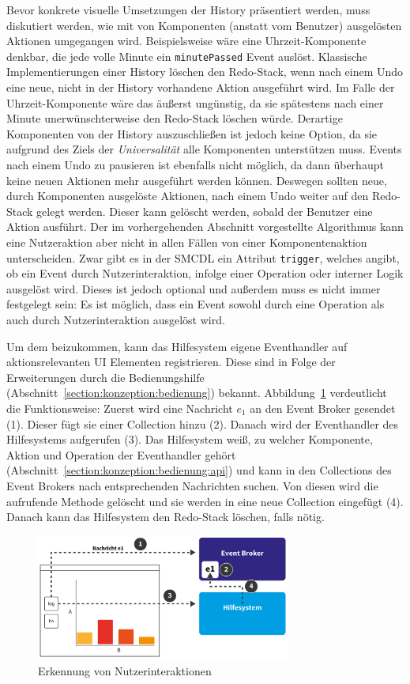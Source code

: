 \documentclass[
	headsepline,
	footsepline,
	fontsize=12pt,
	bibliography=totoc
]{scrbook}
\begin{document}
Bevor konkrete visuelle Umsetzungen der History präsentiert werden, muss diskutiert werden, wie mit von Komponenten (anstatt vom Benutzer) ausgelösten Aktionen umgegangen wird. Beispielsweise wäre eine Uhrzeit-Komponente denkbar, die jede volle Minute ein \texttt{minutePassed} Event auslöst. Klassische Implementierungen einer History löschen den Redo-Stack, wenn nach einem Undo eine neue, nicht in der History vorhandene Aktion ausgeführt wird. Im Falle der Uhrzeit-Komponente wäre das äußerst ungünstig, da sie spätestens nach einer Minute unerwünschterweise den Redo-Stack löschen würde. Derartige Komponenten von der History auszuschließen ist jedoch keine Option, da sie aufgrund des Ziels der \textit{Universalität} alle Komponenten unterstützen muss. Events nach einem Undo zu pausieren ist ebenfalls nicht möglich, da dann überhaupt keine neuen Aktionen mehr ausgeführt werden können. Deswegen sollten neue, durch Komponenten ausgelöste Aktionen, nach einem Undo weiter auf den Redo-Stack gelegt werden. Dieser kann gelöscht werden, sobald der Benutzer eine Aktion ausführt. Der im vorhergehenden Abschnitt vorgestellte Algorithmus kann eine Nutzeraktion aber nicht in allen Fällen von einer Komponentenaktion unterscheiden. Zwar gibt es in der SMCDL ein Attribut \texttt{trigger}, welches angibt, ob ein Event durch Nutzerinteraktion, infolge einer Operation oder interner Logik ausgelöst wird. Dieses ist jedoch optional und außerdem muss es nicht immer festgelegt sein: Es ist möglich, dass ein Event sowohl durch eine Operation als auch durch Nutzerinteraktion ausgelöst wird.

Um dem beizukommen, kann das Hilfesystem eigene Eventhandler auf aktionsrelevanten UI Elementen registrieren. Diese sind in Folge der Erweiterungen durch die Bedienungshilfe (Abschnitt~\ref{section:konzeption:bedienung}) bekannt. Abbildung~\ref{figure:undo-ablauf} verdeutlicht die Funktionsweise: Zuerst wird eine Nachricht $e_1$ an den Event Broker gesendet (1). Dieser fügt sie einer Collection hinzu (2). Danach wird der Eventhandler des Hilfesystems aufgerufen (3). Das Hilfesystem weiß, zu welcher Komponente, Aktion und Operation der Eventhandler gehört (Abschnitt~\ref{section:konzeption:bedienung:api}) und kann in den Collections des Event Brokers nach entsprechenden Nachrichten suchen. Von diesen wird die aufrufende Methode gelöscht und sie werden in eine neue Collection eingefügt (4). Danach kann das Hilfesystem den Redo-Stack löschen, falls nötig.

\begin{figure}[htbp]
   \centering
   \includegraphics[width=0.75\textwidth]{images/konzeption-undo-ablauf.png}
   \caption{Erkennung von Nutzerinteraktionen}
   \label{figure:undo-ablauf}
\end{figure}
\end{document}
